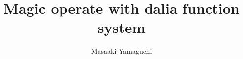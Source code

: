 \documentclass{jsarticle}
\begin{document}
\title{Magic operate with dalia function system}
\author{Masaaki Yamaguchi}
\date{}
\maketitle
   \newcommand{\variint}{%
	\begin{picture}(15,30)
		\put(0,0){
			$ \iint $}
		\put(0,5){\line(15,0){15}}
	\end{picture} %
}

\newcommand{\variiint}{%
	\begin{picture}(15,15)
		\put(0,0){
			$ \iiint $}
		\put(0,5){\line(15,0){20}}
	\end{picture} %
}



 \newcommand{\alearletter}{%
	 \begin{picture}(10,20)
		 \put(0,0){
			 $ \square $}
		 \put(0,0){\line(1,1){10}}
	 \end{picture} %
	 }

 \newcommand{\secproduct}{%
	 \begin{picture}(10,20)
		 \put(0,0){
			 $ \nabla $}
		 \put(5,0){+}
	 \end{picture} %
	 }
 \newcommand{\talot}{%
	 \begin{picture}(15,20)
		 \put(0,0){
			 $ \text{\scalebox{2.0}[2]{$\nabla$}}$}
		 \put(5,3){
			 $ \Delta $}
	 \end{picture} %
	 }
 \newcommand{\hazerdnabla}{%
	 \begin{picture}(15,20)
		 \put(0,0){
			 $ \text{\scalebox{2.0}[2]{$\nabla$}}$}
		 \put(5,3){
			 $\text{Y}  $}
	 \end{picture} %
	 }

 \newcommand{\securebox}{%
	 \begin{picture}(15,20)
		 \put(0,0){
			 $ \text{\scalebox{2.0}[2]{$\square$}}$}
		 \put(5,3){
			 $\text{Y}  $}
	 \end{picture} %
	 }


\newcommand{\timebow}{%
	\begin{picture}(5,5)
		\put(0,0){$\text{\rotatebox{90}{$\bowtie$}}$}
	\end{picture} %
	}


 \newcommand{\flowerletter}{%
	 \begin{picture}(10,20)
		 \put(0,0){$\text{\scalebox{1.0}[1]{$\square$}}$}
		 \put(0,0){$\text{\scalebox{1.0}[2]{$\int$}}$}
	 \end{picture} %
	 }
\newcommand{\squareiint}{%
	\begin{picture}(10,20)
		\put(0,0){
			$ \iint $}
		\put(0,4){$\text{\scalebox{3.0}[0.5]{$\square$}}$}
	\end{picture} %
}
\end{document}
